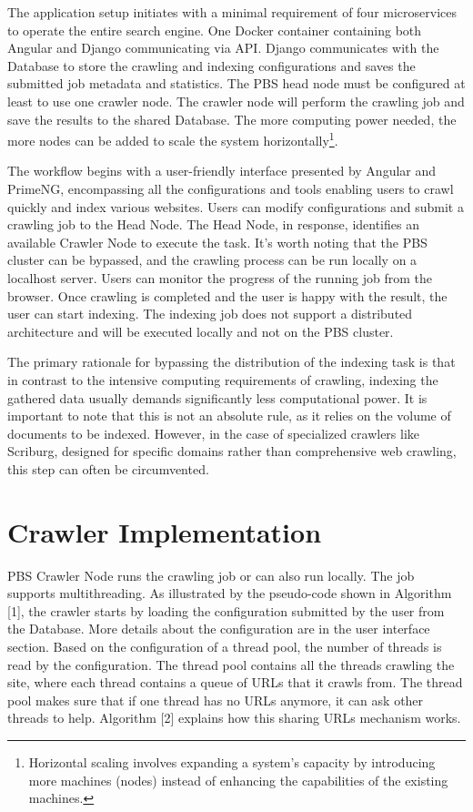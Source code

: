 The application setup initiates with a minimal requirement of four microservices to operate the entire search engine. One Docker container containing both Angular and Django communicating via API. Django communicates with the Database to store the crawling and indexing configurations and saves the submitted job metadata and statistics. The PBS head node must be configured at least to use one crawler node. The crawler node will perform the crawling job and save the results to the shared Database. The more computing power needed, the more nodes can be added to scale the system horizontally\footnote{Horizontal scaling involves expanding a system's capacity by introducing more machines (nodes) instead of enhancing the capabilities of the existing machines.}. 

The workflow begins with a user-friendly interface presented by Angular and PrimeNG, encompassing all the configurations and tools enabling users to crawl quickly and index various websites. Users can modify configurations and submit a crawling job to the Head Node. The Head Node, in response, identifies an available Crawler Node to execute the task. It's worth noting that the PBS cluster can be bypassed, and the crawling process can be run locally on a localhost server. Users can monitor the progress of the running job from the browser. Once crawling is completed and the user is happy with the result, the user can start indexing. The indexing job does not support a distributed architecture and will be executed locally and not on the PBS cluster.

The primary rationale for bypassing the distribution of the indexing task is that in contrast to the intensive computing requirements of crawling, indexing the gathered data usually demands significantly less computational power. It is important to note that this is not an absolute rule, as it relies on the volume of documents to be indexed. However, in the case of specialized crawlers like Scriburg, designed for specific domains rather than comprehensive web crawling, this step can often be circumvented.


\section{Crawler Implementation}\label{sec:crawler-implementation}

PBS Crawler Node runs the crawling job or can also run locally. The job supports multithreading. As illustrated by the pseudo-code shown in Algorithm [1], the crawler starts by loading the configuration submitted by the user from the Database. More details about the configuration are in the user interface section. Based on the configuration of a thread pool, the number of threads is read by the configuration. The thread pool contains all the threads crawling the site, where each thread contains a queue of URLs that it crawls from. The thread pool makes sure that if one thread has no URLs anymore, it can ask other threads to help. Algorithm [2] explains how this sharing URLs mechanism works. 


